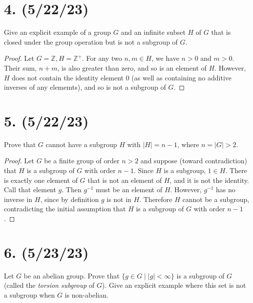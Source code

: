 \documentclass{article}
\begin{document}
\section*{4. (5/22/23)}

Give an explicit example of a group $G$ and an infinite subset $H$ of $G$ that is closed under the group operation but is not a subgroup of $G$.

\begin{proof}
    Let $G = \mathbb{Z}, H = \mathbb{Z}^+$. For any two $n, m \in H$, we have $n > 0$ and $m > 0$. Their sum, $n + m$, is also greater than zero, and so is an element of $H$. However, $H$ does not contain the identity element 0 (as well as containing no additive inverses of any elememts), and so is not a subgroup of $G$.
\end{proof}

\section*{5. (5/22/23)}

Prove that $G$ cannot have a subgroup $H$ with $|H| = n - 1$, where $n = |G| > 2$.

\begin{proof}
    Let $G$ be a finite group of order $n > 2$ and suppose (toward contradiction) that $H$ is a subgroup of $G$ with order $n - 1$. Since $H$ is a subgroup, $1 \in H$. There is exactly one element of $G$ that is not an element of $H$, and it is not the identity. Call that element $g$. Then $g^{-1}$ must be an element of $H$. However, $g^{-1}$ has no inverse in $H$, since by definition $g$ is not in $H$. Therefore $H$ cannot be a subgroup, contradicting the initial assumption that $H$ is a subgroup of $G$ with order $n - 1$.
\end{proof}

\section*{6. (5/23/23)}

Let $G$ be an abelian group. Prove that $\{g \in G \mid |g| < \infty \}$ is a subgroup of $G$ (called the \emph{torsion subgroup} of $G$). Give an explicit example where this set is not a subgroup when $G$ is non-abelian.
\end{document}
